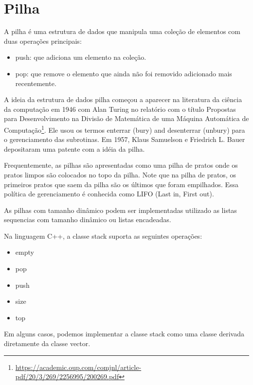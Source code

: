 \chapter{Pilha}

A pilha é uma estrutura de dados que manipula uma coleção de elementos com duas operações principais:

\begin{itemize}
\item push: que adiciona um elemento na coleção.
\item pop: que remove o elemento que ainda não foi removido adicionado mais recentemente.
\end{itemize}


A ideia da estrutura de dados pilha começou a aparecer na literatura da ciência da computação em 1946 com Alan Turing no relatório com o título Propostas para Desenvolvimento na Divisão de Matemática de uma Máquina Automática de Computação\footnote{ \url{https://academic.oup.com/comjnl/article-pdf/20/3/269/2256995/200269.pdf}}.
Ele usou os termos enterrar (bury) and desenterrar (unbury) para o gerenciamento das subrotinas. Em 1957, Klaus Samuelson e Friedrich L. Bauer depositaram uma patente com a idéia da pilha. 



Frequentemente, as pilhas são apresentadas como uma pilha de pratos onde os pratos limpos são colocados no topo da pilha. Note que na pilha de pratos, os primeiros pratos que saem da pilha são os últimos que foram empilhados. Essa política de gerenciamento é conhecida como LIFO (Last in, First out).

As pilhas com tamanho dinâmico podem ser implementadas utilizado as listas sequencias com tamanho dinâmico ou listas encadeadas. 

Na linguagem C++, a classe stack suporta as seguintes operações:

\begin{itemize}
\item empty
\item pop
\item push
\item size
\item top
\end{itemize}


Em alguns casos, podemos implementar a classe stack como uma classe derivada diretamente da classe vector.

